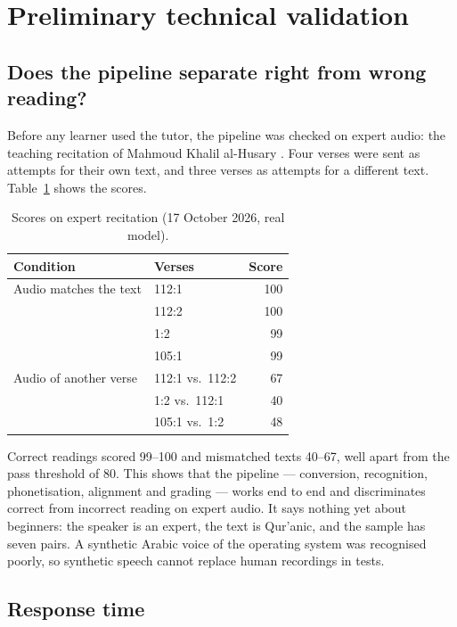 \section{Preliminary technical validation}\label{sec:eval-prelim}

\subsection{Does the pipeline separate right from wrong reading?}

Before any learner used the tutor, the pipeline was checked on expert audio: the teaching recitation of
Mahmoud Khalil al-Husary \cite{SRC-042}. Four verses were sent as attempts for their own text, and three
verses as attempts for a different text. Table~\ref{tab:husary} shows the scores.

\begin{table}[ht]
\centering\small
\caption{Scores on expert recitation (17 October 2026, real model).}
\label{tab:husary}
\begin{tabular}{@{}llr@{}}
\toprule
Condition & Verses & Score \\
\midrule
Audio matches the text & 112:1 & 100 \\
 & 112:2 & 100 \\
 & 1:2 & 99 \\
 & 105:1 & 99 \\
\midrule
Audio of another verse & 112:1 vs.\ 112:2 & 67 \\
 & 1:2 vs.\ 112:1 & 40 \\
 & 105:1 vs.\ 1:2 & 48 \\
\bottomrule
\end{tabular}
\end{table}

Correct readings scored 99--100 and mismatched texts 40--67, well apart from the pass threshold of 80. This
shows that the pipeline --- conversion, recognition, phonetisation, alignment and grading --- works end to
end and discriminates correct from incorrect reading on expert audio. It says nothing yet about beginners:
the speaker is an expert, the text is Qur'anic, and the sample has seven pairs. A synthetic Arabic voice
of the operating system was recognised poorly, so synthetic speech cannot replace human recordings in tests.

\subsection{Response time}

